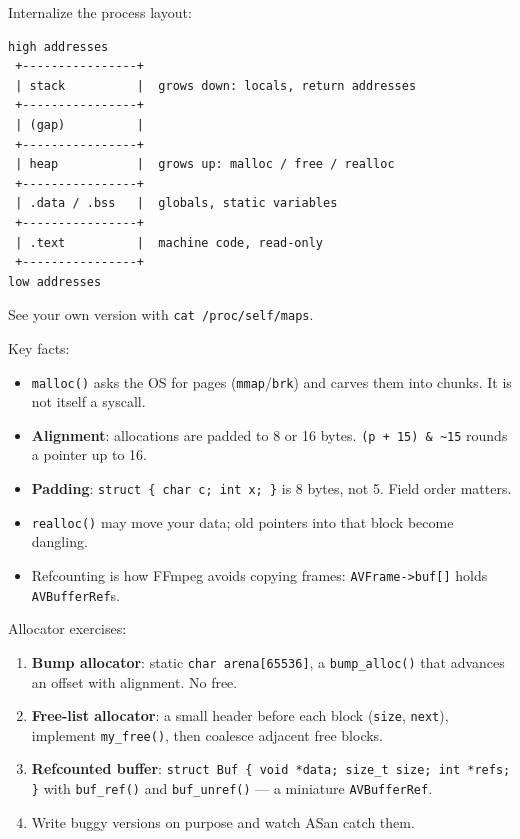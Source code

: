 \documentclass[11pt]{article}
\begin{document}
Internalize the process layout:

\begin{verbatim}
high addresses
 +----------------+
 | stack          |  grows down: locals, return addresses
 +----------------+
 | (gap)          |
 +----------------+
 | heap           |  grows up: malloc / free / realloc
 +----------------+
 | .data / .bss   |  globals, static variables
 +----------------+
 | .text          |  machine code, read-only
 +----------------+
low addresses
\end{verbatim}

See your own version with \texttt{cat /proc/self/maps}.

Key facts:

\begin{itemize}
  \item \texttt{malloc()} asks the OS for pages (\texttt{mmap}/\texttt{brk})
        and carves them into chunks. It is not itself a syscall.
  \item \textbf{Alignment}: allocations are padded to 8 or 16 bytes.
        \verb|(p + 15) & ~15| rounds a pointer up to 16.
  \item \textbf{Padding}: \verb|struct { char c; int x; }| is 8 bytes,
        not 5. Field order matters.
  \item \texttt{realloc()} may move your data; old pointers into that block
        become dangling.
  \item Refcounting is how FFmpeg avoids copying frames:
        \texttt{AVFrame->buf[]} holds \texttt{AVBufferRef}s.
\end{itemize}

Allocator exercises:

\begin{enumerate}
  \item \textbf{Bump allocator}: static \texttt{char arena[65536]}, a
        \verb|bump_alloc()| that advances an offset with alignment. No free.
  \item \textbf{Free-list allocator}: a small header before each block
        (\texttt{size}, \texttt{next}), implement \verb|my_free()|, then
        coalesce adjacent free blocks.
  \item \textbf{Refcounted buffer}: \verb|struct Buf { void *data; size_t size; int *refs; }|
        with \verb|buf_ref()| and \verb|buf_unref()| ---
        a miniature \texttt{AVBufferRef}.
  \item Write buggy versions on purpose and watch ASan catch them.
\end{enumerate}
\end{document}
